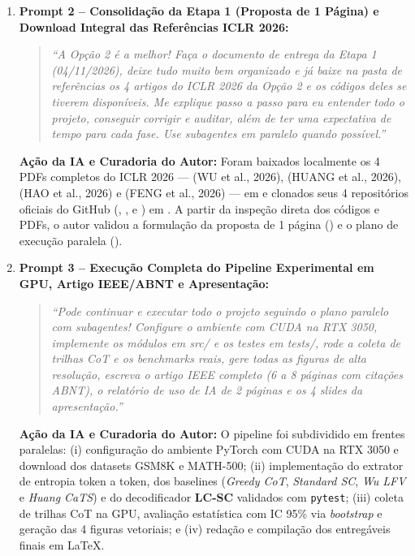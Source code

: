 \documentclass[9pt,a4paper]{extarticle}
\begin{document}
\begin{enumerate}[leftmargin=1.4em, itemsep=2pt, topsep=1pt]
    \item \textbf{Prompt 2 -- Consolida\c{c}\~{a}o da Etapa 1 (Proposta de 1 P\'{a}gina) e Download Integral das Refer\^{e}ncias ICLR 2026:}
    \begin{quote}
    \textit{``A Opção 2 é a melhor! Faça o documento de entrega da Etapa 1 (04/11/2026), deixe tudo muito bem organizado e já baixe na pasta de referências os 4 artigos do ICLR 2026 da Opção 2 e os códigos deles se tiverem disponíveis. Me explique passo a passo para eu entender todo o projeto, conseguir corrigir e auditar, além de ter uma expectativa de tempo para cada fase. Use subagentes em paralelo quando possível.''}
    \end{quote}
    \textbf{A\c{c}\~{a}o da IA e Curadoria do Autor:} Foram baixados localmente os 4 PDFs completos do ICLR 2026 --- (WU et al., 2026), (HUANG et al., 2026), (HAO et al., 2026) e (FENG et al., 2026) --- em  e clonados seus 4 reposit\'{o}rios oficiais do GitHub (, ,  e ) em . A partir da inspe\c{c}\~{a}o direta dos c\'{o}digos e PDFs, o autor validou a formula\c{c}\~{a}o da proposta de 1 p\'{a}gina () e o plano de execu\c{c}\~{a}o paralela ().

    \item \textbf{Prompt 3 -- Execu\c{c}\~{a}o Completa do Pipeline Experimental em GPU, Artigo IEEE/ABNT e Apresenta\c{c}\~{a}o:}
    \begin{quote}
    \textit{``Pode continuar e executar todo o projeto seguindo o plano paralelo com subagentes! Configure o ambiente com CUDA na RTX 3050, implemente os módulos em src/ e os testes em tests/, rode a coleta de trilhas CoT e os benchmarks reais, gere todas as figuras de alta resolução, escreva o artigo IEEE completo (6 a 8 páginas com citações ABNT), o relatório de uso de IA de 2 páginas e os 4 slides da apresentação.''}
    \end{quote}
    \textbf{A\c{c}\~{a}o da IA e Curadoria do Autor:} O pipeline foi subdividido em frentes paralelas: (i) configura\c{c}\~{a}o do ambiente PyTorch com CUDA na RTX 3050 e download dos datasets GSM8K e MATH-500; (ii) implementa\c{c}\~{a}o do extrator de entropia token a token, dos baselines (\textit{Greedy CoT}, \textit{Standard SC}, \textit{Wu LFV} e \textit{Huang CaTS}) e do decodificador \textbf{LC-SC} validados com \texttt{pytest}; (iii) coleta de trilhas CoT na GPU, avalia\c{c}\~{a}o estat\'{i}stica com IC 95\% via \textit{bootstrap} e gera\c{c}\~{a}o das 4 figuras vetoriais; e (iv) reda\c{c}\~{a}o e compila\c{c}\~{a}o dos entreg\'{a}veis finais em LaTeX.
\end{enumerate}
\end{document}
